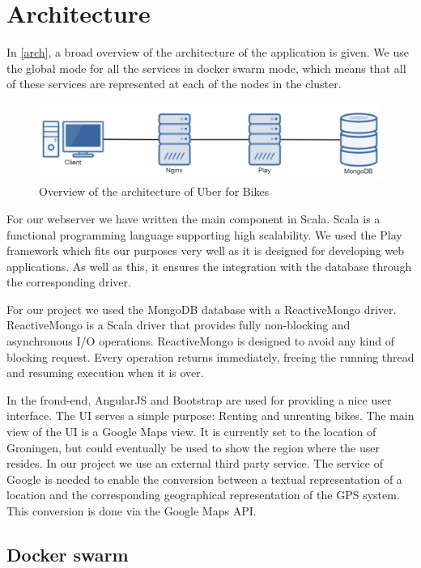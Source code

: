 \section{Architecture}
In \autoref{arch}, a broad overview of the architecture of the application is given. We use the global mode for all the services in docker swarm mode, which means that all of these services are represented at each of the nodes in the cluster.

    \begin{figure}[H]
		\centering
		\includegraphics[width=1.0\textwidth]{images/Architecture.png}
		\caption{Overview of the architecture of Uber for Bikes}
		\label{arch}
	\end{figure}
	
For our webserver we have written the main component in Scala. Scala is a functional programming language supporting high scalability. We used the Play framework which fits our purposes very well as it is designed for developing web applications.  As well as this, it ensures the integration with the database through the corresponding driver. 

For our project we used the MongoDB database with a ReactiveMongo driver. ReactiveMongo is a Scala driver that provides fully non-blocking and asynchronous I/O operations. ReactiveMongo is designed to avoid any kind of blocking request. Every operation returns immediately, freeing the running thread and resuming execution when it is over.

In the frond-end, AngularJS and Bootstrap are used for providing a nice user interface. The UI serves a simple purpose: Renting and unrenting bikes. The main view of the UI is a Google Maps view. It is currently set to the location of Groningen, but could eventually be used to show the region where the user resides.
In our project we use an external third party service. The service of Google is needed to enable the conversion between a textual representation of a location and the corresponding geographical representation of the GPS system. This conversion is done via the Google Maps API.


\subsection{Docker swarm}

